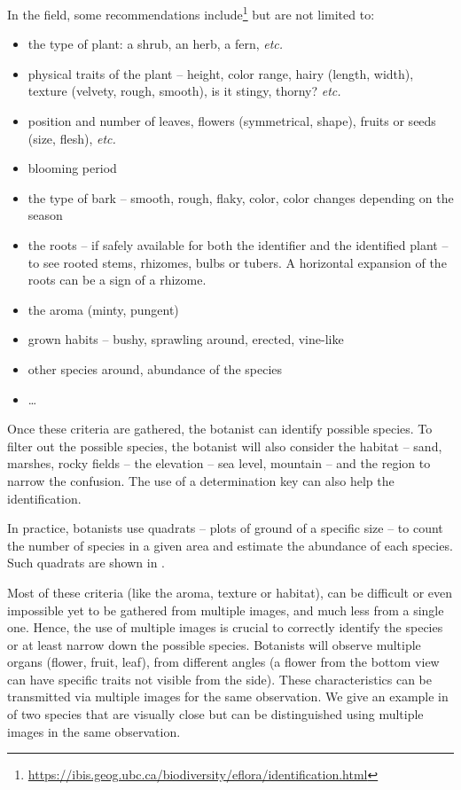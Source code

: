 In the field, some recommendations include\footnote{\url{https://ibis.geog.ubc.ca/biodiversity/eflora/identification.html}} but are not limited to:
\begin{itemize}
        \item the type of plant: a shrub, an herb, a fern, \emph{etc.}
        \item physical traits of the plant -- height, color range, hairy (length, width), texture (velvety, rough, smooth), is it stingy, thorny? \emph{etc.}
        \item position and number of leaves, flowers (symmetrical, shape), fruits or seeds (size, flesh), \emph{etc.}
        \item blooming period
        \item the type of bark -- smooth, rough, flaky, color, color changes depending on the season
        \item the roots -- if safely available for both the identifier and the identified plant -- to see rooted stems, rhizomes, bulbs or tubers. A horizontal expansion of the roots can be a sign of a rhizome.
        \item the aroma (minty, pungent)
        \item grown habits -- bushy, sprawling around, erected, vine-like
        \item other species around, abundance of the species
        \item \dots
\end{itemize}

Once these criteria are gathered, the botanist can identify possible species.
To filter out the possible species, the botanist will also consider the habitat -- sand, marshes, rocky fields -- the elevation -- sea level, mountain -- and the region to narrow the confusion.
The use of a determination key can also help the identification.

In practice, botanists use quadrats -- plots of ground of a specific size -- to count the number of species in a given area and estimate the abundance of each species. Such quadrats are shown in .


Most of these criteria (like the aroma, texture or habitat), can be difficult or even impossible yet to be gathered from multiple images, and much less from a single one.
Hence, the use of multiple images is crucial to correctly identify the species or at least narrow down the possible species.
Botanists will observe multiple organs (flower, fruit, leaf), from different angles (a flower from the bottom view can have specific traits not visible from the side).
These characteristics can be transmitted via multiple images for the same observation.
We give an example in  of two species that are visually close but can be distinguished using multiple images in the same observation.

